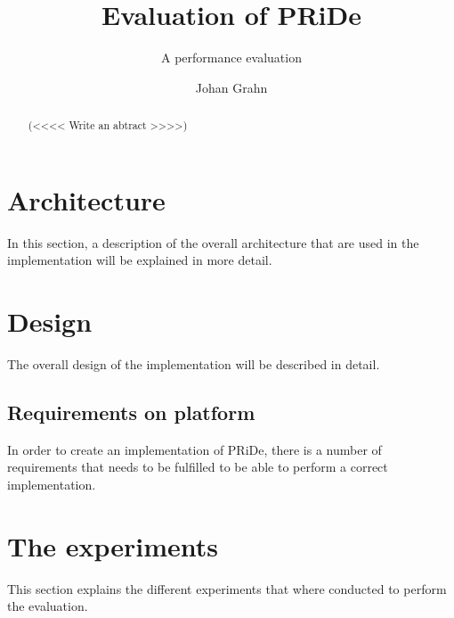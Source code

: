 \documentclass[MSc, ida]{histhesis}
\title{Evaluation of PRiDe}
\subtitle{A performance evaluation}
\author{Johan Grahn}
\begin{document}
\maketitle
\begin{abstract}

(<<<< Write an abtract >>>>)

\end{abstract}
\tableofcontents
\thispagestyle{plain}
\listoftables
\newpage

\newpage

\newpage

\newpage

\newpage

\section{Architecture} %
\label{sec:arch}

In this section, a description of the overall architecture that are used in the implementation will be explained in more detail.  


\section{Design} %
\label{sec:design}

The overall design of the implementation will be described in detail. 

\subsection{Requirements on platform} %
\label{sub:s}

In order to create an implementation of PRiDe, there is a number of requirements that needs to be fulfilled to be able to perform a correct implementation.



  



\section{The experiments} %
\label{sec:the_experiments}

This section explains the different experiments that where conducted to perform the evaluation. 
\end{document}
